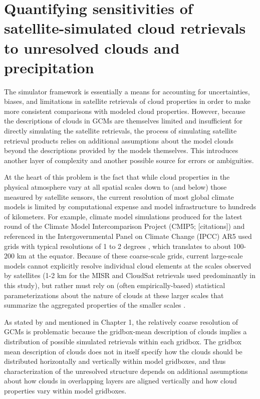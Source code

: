 \chapter{Quantifying sensitivities of satellite-simulated cloud
retrievals to unresolved clouds and precipitation}\label{sec:subgrid1}

The simulator framework is essentially a means for accounting for
uncertainties, biases, and limitations in satellite retrievals of cloud
properties in order to make more consistent comparisons with modeled
cloud properties. However, because the descriptions of clouds in GCMs
are themselves limited and insufficient for directly simulating the
satellite retrievals, the process of simulating satellite retrieval
products relies on additional assumptions about the model clouds beyond
the descriptions provided by the models themselves. This introduces
another layer of complexity and another possible source for errors or
ambiguities.

At the heart of this problem is the fact that while cloud properties in
the physical atmosphere vary at all spatial scales down to (and below)
those measured by satellite sensors, the current resolution of most
global climate models is limited by computational expense and model
infrastructure to hundreds of kilometers. For example, climate model
simulations produced for the latest round of the Climate Model
Intercomparison Project (CMIP5; {[}citations{]}) and referenced in the
Intergovernmental Panel on Climate Change (IPCC) AR5 used grids with
typical resolutions of 1 to 2 degrees \citep{flato_et_al_2013}, which
translates to about 100-200 km at the equator. Because of these
coarse-scale grids, current large-scale models cannot explicitly resolve
individual cloud elements at the scales observed by satellites (1-2 km
for the MISR and CloudSat retrievals used predominantly in this study),
but rather must rely on (often empirically-based) statistical
parameterizations about the nature of clouds at these larger scales that
summarize the aggregated properties of the smaller scales
\citep{randall_et_al_2003}.

As stated by \citet{pincus_et_al_2012} and mentioned in Chapter 1, the
relatively coarse resolution of GCMs is problematic because the
gridbox-mean description of clouds implies a distribution of possible
simulated retrievals within each gridbox. The gridbox mean description
of clouds does not in itself specify how the clouds should be
distributed horizontally and vertically within model gridboxes, and thus
characterization of the unresolved structure depends on additional
assumptions about how clouds in overlapping layers are aligned
vertically and how cloud properties vary within model gridboxes.

